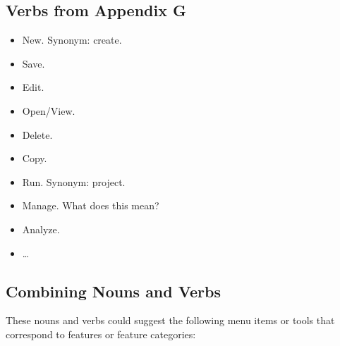 \documentclass[titlepage]{article}
\begin{document}
\subsection{Verbs from Appendix G}

\begin{itemize}
  \item New.  Synonym: create.
  \item Save.
  \item Edit.
  \item Open/View.
  \item Delete.
  \item Copy.
  \item Run.  Synonym: project.
  \item Manage.  What does this mean?
  \item Analyze.
  \item \ldots
\end{itemize}

\subsection{Combining Nouns and Verbs}

These nouns and verbs could suggest the following menu items or tools that correspond to features or feature categories:
\end{document}
